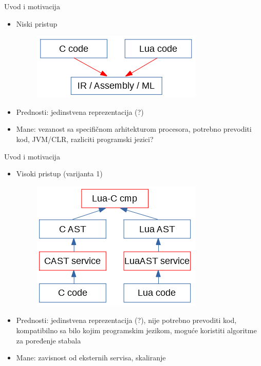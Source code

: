\documentclass{beamer}
\begin{document}
\begin{frame}{Uvod i motivacija}
    \begin{itemize}
        \item Niski pristup
        \begin{figure}[h!]
            \centering
            \includegraphics[scale=0.8]{images/approach_1.PNG}
        \end{figure}
        \item Prednosti: jedinstvena reprezentacija (?)
        \item Mane: vezanost sa specifi\v{c}nom arhitekturom procesora, potrebno prevoditi kod, JVM/CLR, razliciti programski jezici?
    \end{itemize}
\end{frame}

\begin{frame}{Uvod i motivacija}
    \begin{itemize}
        \item Visoki pristup (varijanta 1)
        \begin{figure}[h!]
            \centering
            \includegraphics[scale=0.8]{images/approach_2.PNG}
        \end{figure}
        \item Prednosti: jedinstvena reprezentacija (?), nije potrebno prevoditi kod, kompatibilno sa bilo kojim programskim jezikom, mogu\'c{}e koristiti algoritme za poređenje stabala
        \item Mane: zavisnost od eksternih servisa, skaliranje
    \end{itemize}
\end{frame}
\end{document}
